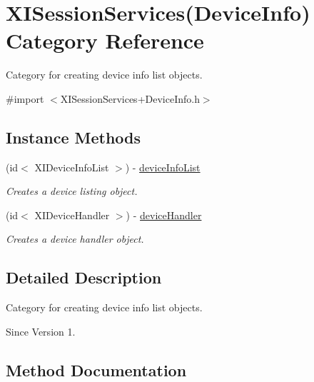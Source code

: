 \hypertarget{category_x_i_session_services_07_device_info_08}{}\section{X\+I\+Session\+Services(Device\+Info) Category Reference}
\label{category_x_i_session_services_07_device_info_08}


Category for creating device info list objects.  




{\ttfamily \#import $<$X\+I\+Session\+Services+\+Device\+Info.\+h$>$}

\subsection*{Instance Methods}
\begin{DoxyCompactItemize}
\item 
(id$<$ X\+I\+Device\+Info\+List $>$) -\/ \hyperlink{category_x_i_session_services_07_device_info_08_a7a24cbd0be8420fe8f6360a7e2324810}{device\+Info\+List}
\begin{DoxyCompactList}\small\item\em Creates a device listing object. \end{DoxyCompactList}\item 
(id$<$ X\+I\+Device\+Handler $>$) -\/ \hyperlink{category_x_i_session_services_07_device_info_08_a893fef6113f3ae187e061dd831f4a818}{device\+Handler}
\begin{DoxyCompactList}\small\item\em Creates a device handler object. \end{DoxyCompactList}\end{DoxyCompactItemize}


\subsection{Detailed Description}
Category for creating device info list objects. 

\begin{DoxySince}{Since}
Version 1. 
\end{DoxySince}


\subsection{Method Documentation}
\hypertarget{category_x_i_session_services_07_device_info_08_a893fef6113f3ae187e061dd831f4a818}{}\label{category_x_i_session_services_07_device_info_08_a893fef6113f3ae187e061dd831f4a818} 
